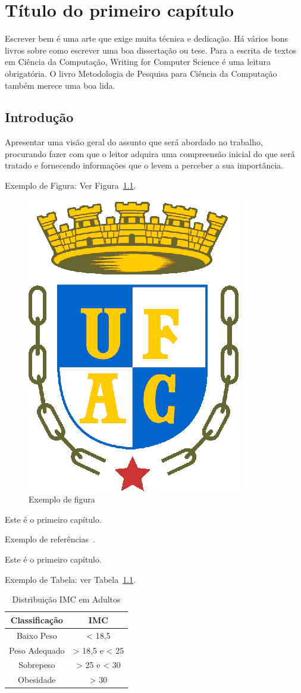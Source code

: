 \chapter{T\'itulo do primeiro cap\'itulo} \label{cap:cap1}

Escrever bem é uma arte que exige muita técnica e dedicação. Há vários bons livros sobre como escrever uma boa dissertação ou tese. Para a escrita de textos em Ciência da Computação, Writing for Computer Science \cite{zobel2014} é uma leitura obrigatória. O livro Metodologia de Pesquisa para Ciência da Computação \cite{wazlawick2009} também merece uma boa lida. 

\section{Introdu\c{c}\~ao}\label{sec:intro}

Apresentar uma visão geral do assunto que será abordado no trabalho, procurando fazer com que o leitor adquira uma compreensão inicial do que será tratado e fornecendo informações que o levem a perceber a sua importância.  

Exemplo de Figura: Ver Figura~\ref{fig:exefig}.

\begin{figure}[!ht]
\centering
\includegraphics[width=0.3\linewidth]{figuras/exefig.eps}
\caption{Exemplo de figura}
\label{fig:exefig}
\end{figure}

Este \'e o primeiro cap\'itulo. 

Exemplo de refer\^encias~\cite{tese2011, confinter2011, confnac2011, rev2011, site2011}.

Este \'e o primeiro cap\'itulo. 

Exemplo de Tabela: ver Tabela~\ref{tab:exetab}.

\begin{table}[!ht]
\begin{center}
\caption{Distribuição IMC em Adultos}
\label{tab:exetab}
\begin{tabular}{|c |c |}
\hline
\textbf{\textbf{Classificação}} & \textbf{IMC}\\
\hline\hline
Baixo Peso & < 18,5 \\
Peso Adequado & > 18,5 e < 25 \\
Sobrepeso & > 25 e < 30 \\
Obesidade & > 30 \\
\hline
\end{tabular}
\end{center}
\end{table}

